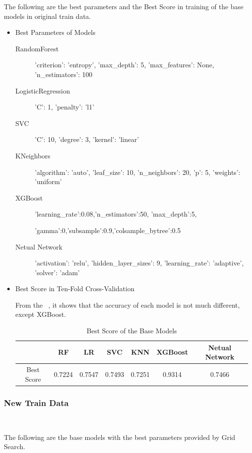 The following are the best parameters and 
the Best Score in training of 
the base models 
in original train data. 

\begin{itemize}
	\item Best Parameters of Models
	\begin{description}
		\item[RandomForest] 'criterion': 'entropy', 'max_depth': 5, 
		'max_features': None, 'n_estimators': 100
		\item[LogisticRegression] 'C': 1, 'penalty': 'l1'
		\item[SVC] 'C': 10, 'degree': 3, 'kernel': 'linear'
		\item[KNeighbors] 'algorithm': 'auto', 'leaf_size': 10, 
		'n_neighbors': 20, 'p': 5, 'weights': 'uniform'
		\item[XGBoost] 'learning_rate':0.08,'n_estimators':50,
		'max_depth':5,
		
		'gamma':0,'subsample':0.9,'colsample_bytree':0.5
		\item[Netual Network] 'activation': 'relu', 'hidden_layer_sizes': 9, 
		'learning_rate': 'adaptive', 'solver': 'adam'
	\end{description}
	
	\item Best Score in Ten-Fold Cross-Validation
	
	From the  ~,
	it shows that the accuracy of 
	each model is not much different,
	except XGBoost.
	
	\begin{table}[h]  \centering
		\caption{Best Score of the Base Models}
		\label{tbl:best_score_base_models_old}
		\begin{tabular}{ccccccc}
			\toprule
			& RF  & LR & SVC & KNN & XGBoost & Netual Network\\
			\midrule
			Best Score & 0.7224  & 0.7547 & 0.7493 & 0.7251 & 0.9314 & 0.7466\\
			\bottomrule
		\end{tabular}
	\end{table}
\end{itemize}

\subsubsection{New Train Data}
\

The following are the base models 
with the best parameters 
provided by Grid Search.


